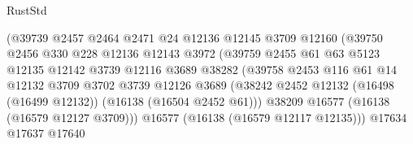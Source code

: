\begin{lexlean}{RustStd}
\begin{coremodule}
                                      (@39739
                                        @2457
                                        @2464
                                        @2471
                                        @24
                                        @12136
                                        @12145
                                        @3709
                                        @12160
                                        (@39750
                                          @2456
                                          @330
                                          @228
                                          @12136
                                          @12143
                                          @3972
                                          (@39759
                                            @2455
                                            @61
                                            @63
                                            @5123
                                            @12135
                                            @12142
                                            @3739
                                            @12116
                                            @3689
                                            @38282
                                            (@39758
                                              @2453
                                              @116
                                              @61
                                              @14
                                              @12132
                                              @3709
                                              @3702
                                              @3739
                                              @12126
                                              @3689
                                              (@38242
                                                @2452
                                                @12132
                                                (@16498 (@16499 @12132))
                                                (@16138 (@16504 @2452 @61)))
                                              @38209
                                              @16577
                                              (@16138 (@16579 @12127 @3709)))
                                            @16577
                                            (@16138 (@16579 @12117 @12135)))
                                          @17634
                                          @17637
                                          @17640

\end{coremodule}
\end{lexlean}
